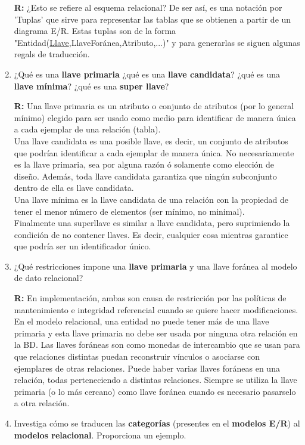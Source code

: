 \documentclass{article}
\begin{document}
\begin{enumerate}[label = \alph*.]
            \textbf{R: }{¿Esto se refiere al esquema relacional? De ser así,
            es una notación por 'Tuplas' que sirve para representar las 
            tablas que se obtienen a partir de un diagrama E/R. Estas tuplas
            son de la forma "Entidad(\underline{Llave},LlaveForánea,Atributo,...)"
            y para generarlas se siguen algunas regals de traducción.}
        \item ¿Qué es una \textbf{llave primaria} ¿qué es una \textbf{llave 
        candidata}? ¿qué es una \textbf{llave mínima}? ¿qué es una \textbf{super
        llave}?
        
            \textbf{R: }{Una llave primaria es un atributo o conjunto de atributos 
            (por lo general mínimo) elegido para ser usado como medio para 
            identificar de manera única a cada ejemplar de una relación (tabla).\\
            Una llave candidata es una posible llave, es decir, un conjunto de 
            atributos que podrían identificar a cada ejemplar de manera única. 
            No necesariamente es la llave primaria, sea por alguna razón ó 
            solamente como elección de diseño. Además, toda llave candidata garantiza
            que ningún subconjunto dentro de ella es llave candidata.\\
            Una llave mínima es la llave candidata de una relación con la propiedad
            de tener el menor número de elementos (ser mínimo, no minimal).\\
            Finalmente una superllave es similar a llave candidata, pero suprimiendo
            la condición de no contener llaves. Es decir, cualquier cosa mientras
            garantice que podría ser un identificador único.}
        \item ¿Qué restricciones impone una \textbf{llave primaria} y una llave 
        foránea al modelo de dato relacional?
        
            \textbf{R: }{En implementación, ambas son causa de restricción por las
            políticas de mantenimiento e integridad referencial cuando se quiere 
            hacer modificaciones. En el modelo relacional, una entidad no puede 
            tener más de una llave primaria y esta llave primaria no debe ser usada
            por ninguna otra relación en la BD. Las llaves foráneas son como monedas
            de intercambio que se usan para que relaciones distintas puedan reconstruir
            vínculos o asociarse con ejemplares de otras relaciones. Puede haber varias
            llaves foráneas en una relación, todas perteneciendo a distintas relaciones.
            Siempre se utiliza la llave primaria (o lo más cercano) como llave foránea
            cuando es necesario pasarselo a otra relación.}
        \item Investiga cómo se traducen las \textbf{categorías} (presentes en
        el \textbf{modelos E/R}) al \textbf{modelos relacional}. Proporciona un 
        ejemplo.
        

\end{enumerate}
\end{document}
